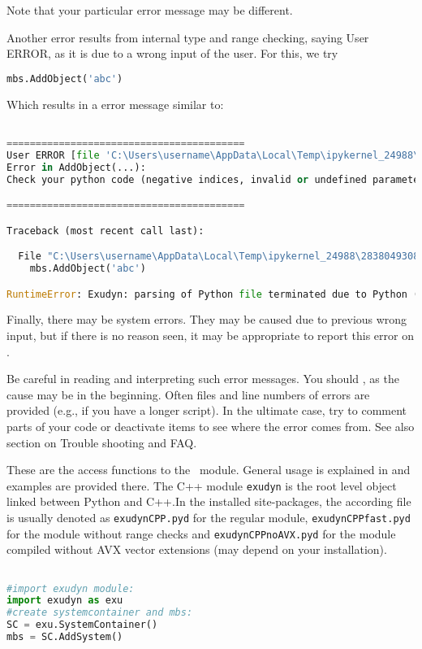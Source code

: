 Note that your particular error message may be different.

Another error results from internal type and range checking, saying User ERROR, as it is due to a wrong input of the user. For this, we try
\pythonstyle
\begin{lstlisting}[language=Python, firstnumber=1]
mbs.AddObject('abc')
\end{lstlisting}


Which results in a error message similar to:
\pythonstyle
\begin{lstlisting}[language=Python, firstnumber=1]

=========================================
User ERROR [file 'C:\Users\username\AppData\Local\Temp\ipykernel_24988\2838049308.py', line 1]: 
Error in AddObject(...):
Check your python code (negative indices, invalid or undefined parameters, ...)

=========================================

Traceback (most recent call last):

  File "C:\Users\username\AppData\Local\Temp\ipykernel_24988\2838049308.py", line 1, in <module>
    mbs.AddObject('abc')

RuntimeError: Exudyn: parsing of Python file terminated due to Python (user) error
\end{lstlisting}


Finally, there may be system errors. They may be caused due to previous wrong input, but if there is no reason seen, it may be appropriate to report this error on  .

Be careful in reading and interpreting such error messages. You should , as the cause may be in the beginning. Often files and line numbers of errors are provided (e.g., if you have a longer script). In the ultimate case, try to comment parts of your code or deactivate items to see where the error comes from. See also section on Trouble shooting and FAQ.

\mysubsection{\codeName}



These are the access functions to the \codeName\ module. General usage is explained in  and examples are provided there. The C++ module \texttt{exudyn} is the root level object linked between Python and C++.In the installed site-packages, the according file is usually denoted as \texttt{exudynCPP.pyd} for the regular module, \texttt{exudynCPPfast.pyd} for the module without range checks and \texttt{exudynCPPnoAVX.pyd} for the module compiled without AVX vector extensions (may depend on your installation).
\pythonstyle
\begin{lstlisting}[language=Python, firstnumber=1]

#import exudyn module:
import exudyn as exu
#create systemcontainer and mbs:
SC = exu.SystemContainer()
mbs = SC.AddSystem()
\end{lstlisting}

